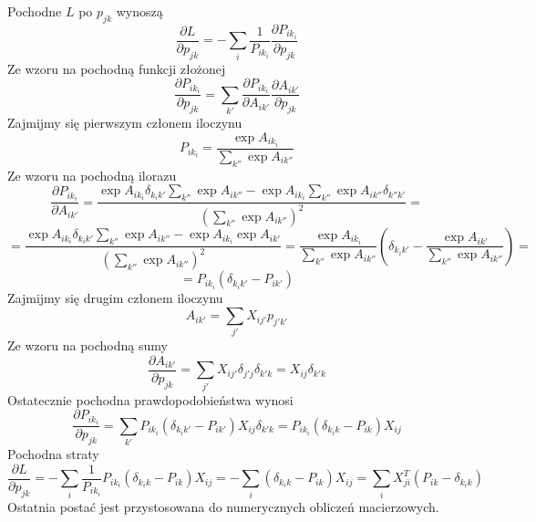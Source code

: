 \documentclass[10pt,a4paper]{article}
\begin{document}
Pochodne $L$ po $p_{jk}$ wynoszą
\begin{displaymath}
\frac{\partial L}{\partial p_{jk}}=-\sum_i\frac{1}{P_{ik_i}}\frac{\partial P_{ik_i}}{\partial p_{jk}}
\end{displaymath}
Ze wzoru na pochodną funkcji złożonej
\begin{displaymath}
\frac{\partial P_{ik_i}}{\partial p_{jk}}=\sum_{k'}\frac{\partial P_{ik_i}}{\partial A_{ik'}}\frac{\partial A_{ik'}}{\partial p_{jk}}
\end{displaymath}
Zajmijmy się pierwszym członem iloczynu
\begin{displaymath}
P_{ik_i}=\frac{\exp A_{ik_i}}{\sum_{k''}\exp A_{ik''}}
\end{displaymath}
Ze wzoru na pochodną ilorazu
\begin{displaymath}
\frac{\partial P_{ik_i}}{\partial A_{ik'}}=\frac{\exp A_{ik_i}\delta_{k_ik'}\sum_{k''}\exp A_{ik''}-\exp A_{ik_i}\sum_{k''}\exp A_{ik''}\delta_{k''k'}}{(\sum_{k''}\exp A_{ik''})^2}=
\end{displaymath}
\begin{displaymath}
=\frac{\exp A_{ik_i}\delta_{k_ik'}\sum_{k''}\exp A_{ik''}-\exp A_{ik_i}\exp A_{ik'}}{(\sum_{k''}\exp A_{ik''})^2}=\frac{\exp A_{ik_i}}{\sum_{k''}\exp A_{ik''}}\left(\delta_{k_ik'}-\frac{\exp A_{ik'}}{\sum_{k''}\exp A_{ik''}}\right)=
\end{displaymath}
\begin{displaymath}
=P_{ik_i}(\delta_{k_ik'}-P_{ik'})
\end{displaymath}
Zajmijmy się drugim członem iloczynu
\begin{displaymath}
A_{ik'}=\sum_{j'}X_{ij'}p_{j'k'}
\end{displaymath}
Ze wzoru na pochodną sumy
\begin{displaymath}
\frac{\partial A_{ik'}}{\partial p_{jk}}=\sum_{j'}X_{ij'}\delta_{j'j}\delta_{k'k}=X_{ij}\delta_{k'k}
\end{displaymath}
Ostatecznie pochodna prawdopodobieństwa wynosi
\begin{displaymath}
\frac{\partial P_{ik_i}}{\partial p_{jk}}=\sum_{k'}P_{ik_i}(\delta_{k_ik'}-P_{ik'})X_{ij}\delta_{k'k}=P_{ik_i}(\delta_{k_ik}-P_{ik})X_{ij}
\end{displaymath}
Pochodna straty
\begin{displaymath}
\frac{\partial L}{\partial p_{jk}}=-\sum_i\frac{1}{P_{ik_i}}P_{ik_i}(\delta_{k_ik}-P_{ik})X_{ij}=-\sum_i(\delta_{k_ik}-P_{ik})X_{ij}=\sum_iX^T_{ji}(P_{ik}-\delta_{k_ik})
\end{displaymath}
Ostatnia postać jest przystosowana do numerycznych obliczeń macierzowych.
\end{document}
